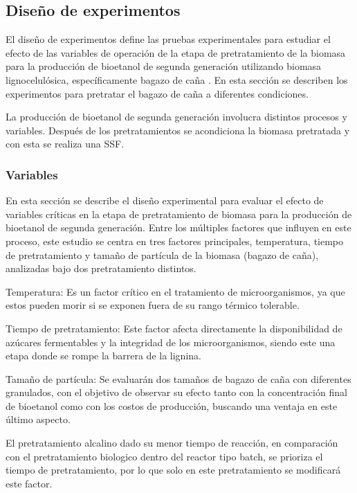 \documentclass[12pt]{article}
\begin{document}
	
	
	\subsection{Diseño de experimentos}
	
	El diseño de experimentos define las pruebas experimentales para estudiar el efecto de las variables de operación de la etapa de pretratamiento de la biomasa para la producción de bioetanol de segunda generación utilizando biomasa lignocelulósica, específicamente bagazo de caña . En esta sección se describen los experimentos para pretratar el bagazo de caña a diferentes condiciones.
	
	La producción de bioetanol de segunda generación involucra distintos procesos y variables. Después de los pretratamientos se acondiciona la biomasa pretratada y con esta se realiza una SSF.
	
 		\subsubsection{Variables}
		\label{variables}
		
En esta sección se describe el diseño experimental para evaluar el efecto de variables críticas en la etapa de pretratamiento de biomasa para la producción de bioetanol de segunda generación. Entre los múltiples factores que influyen en este proceso, este estudio se centra en tres factores principales, temperatura, tiempo de pretratamiento y tamaño de partícula de la biomasa (bagazo de caña), analizadas bajo dos pretratamiento distintos.

Temperatura: Es un factor crítico en el tratamiento de microorganismos, ya que estos pueden morir si se exponen fuera de su rango térmico tolerable. 

Tiempo de pretratamiento: Este factor afecta directamente la disponibilidad de azúcares fermentables y la integridad de los microorganismos, siendo este una etapa donde se rompe la barrera de la lignina.

Tamaño de partícula: Se evaluarán dos tamaños de bagazo de caña con diferentes granulados, con el objetivo de observar su efecto tanto con la concentración final de bioetanol como con los costos de producción, buscando una ventaja en este último aspecto.

El pretratamiento alcalino dado su menor tiempo de reacción, en comparación con el pretratamiento biologico dentro del reactor tipo batch, se prioriza el tiempo de pretratamiento, por lo que solo en este pretratamiento se modificará este factor.
\end{document}
